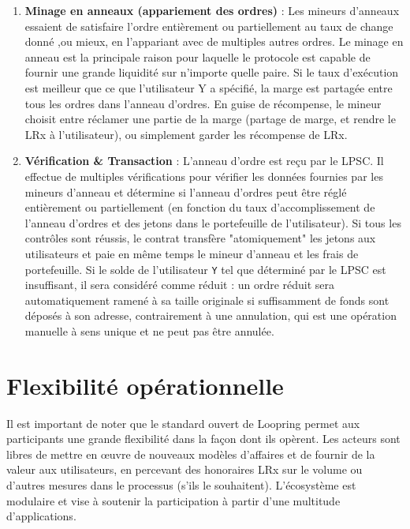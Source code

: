 \documentclass[UTF8,nofonts]{article}
\makeatletter
\newenvironment{figurehere}
 {\def\@captype{figure}}
 {}
\makeatother
\begin{document}
\begin{multicols}{2}
\begin{enumerate}
\item \textbf{Minage en anneaux (appariement des ordres)} : Les mineurs d’anneaux  essaient de satisfaire l’ordre entièrement ou partiellement au taux de change donné ,ou mieux, en l'appariant avec de multiples autres ordres. Le minage en anneau est la principale raison pour laquelle le protocole est capable de fournir une grande liquidité sur n'importe quelle paire. Si le taux d'exécution est meilleur que ce que l'utilisateur Y a spécifié, la marge est partagée entre tous les ordres dans l’anneau d’ordres. En guise de récompense, le mineur choisit entre réclamer une partie de la marge (partage de marge, et rendre le LRx à l'utilisateur), ou simplement garder les récompense de LRx.

\item \textbf{Vérification \& Transaction} : L'anneau d'ordre est reçu par le LPSC. Il effectue de multiples vérifications pour vérifier les données fournies par les mineurs d’anneau et détermine si l'anneau d’ordres peut être réglé entièrement ou partiellement (en fonction du taux d’accomplissement de l'anneau d’ordres et des jetons dans le portefeuille de l'utilisateur). Si tous les contrôles sont réussis, le contrat transfère "atomiquement" les jetons aux utilisateurs et paie en même temps le mineur d’anneau et les frais de portefeuille. Si le solde de l'utilisateur \verb|Y| tel que déterminé par le LPSC est insuffisant, il sera considéré comme réduit : un ordre réduit sera automatiquement ramené à sa taille originale si suffisamment de fonds sont déposés à son adresse, contrairement à une annulation, qui est une opération manuelle à sens unique et ne peut pas être annulée.

\end{enumerate}





%
%
%

\section{Flexibilité opérationnelle\label{sec:business_model}}
Il est important de noter que le standard ouvert de Loopring permet aux participants une grande flexibilité dans la façon dont ils opèrent. Les acteurs sont libres de mettre en œuvre de nouveaux modèles d'affaires et de fournir de la valeur aux utilisateurs, en percevant des honoraires LRx sur le volume ou d'autres mesures dans le processus (s'ils le souhaitent). L'écosystème est modulaire et vise à soutenir la participation à partir d'une multitude d'applications.



\end{multicols}
\end{document}
